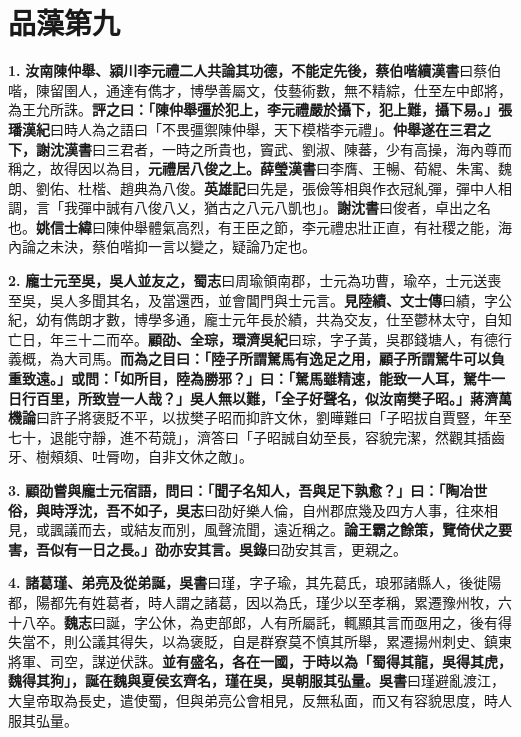 \chapter{品藻第九}

\textbf{1.} \textbf{汝南陳仲舉、潁川李元禮二人共論其功德，不能定先後，蔡伯喈}{\footnotesize \textbf{續漢書}曰蔡伯喈，陳留圉人，通達有儁才，博學善屬文，伎藝術數，無不精綜，仕至左中郎將，為王允所誅。}\textbf{評之曰：「陳仲舉彊於犯上，李元禮嚴於攝下，犯上難，攝下易。」}{\footnotesize \textbf{張璠漢紀}曰時人為之語曰「不畏彊禦陳仲舉，天下模楷李元禮」。}\textbf{仲舉遂在三君之下，}{\footnotesize \textbf{謝沈漢書}曰三君者，一時之所貴也，竇武、劉淑、陳蕃，少有高操，海內尊而稱之，故得因以為目，}\textbf{元禮居八俊之上。}{\footnotesize \textbf{薛瑩漢書}曰李膺、王暢、荀緄、朱㝢、魏朗、劉佑、杜楷、趙典為八俊。\textbf{英雄記}曰先是，張儉等相與作衣冠糺彈，彈中人相調，言「我彈中誠有八俊八乂，猶古之八元八凱也」。\textbf{謝沈書}曰俊者，卓出之名也。\textbf{姚信士緯}曰陳仲舉體氣高烈，有王臣之節，李元禮忠壯正直，有社稷之能，海內論之未決，蔡伯喈抑一言以變之，疑論乃定也。}

\textbf{2.} \textbf{龐士元至吳，吳人並友之，}{\footnotesize \textbf{蜀志}曰周瑜領南郡，士元為功曹，瑜卒，士元送喪至吳，吳人多聞其名，及當還西，並會閶門與士元言。}\textbf{見陸績、}{\footnotesize \textbf{文士傳}曰績，字公紀，幼有儁朗才數，博學多通，龐士元年長於績，共為交友，仕至鬱林太守，自知亡日，年三十二而卒。}\textbf{顧劭、全琮，}{\footnotesize \textbf{環濟吳紀}曰琮，字子黃，吳郡錢塘人，有德行義概，為大司馬。}\textbf{而為之目曰：「陸子所謂駑馬有逸足之用，顧子所謂駑牛可以負重致遠。」或問：「如所目，陸為勝邪？」曰：「駑馬雖精速，能致一人耳，駑牛一日行百里，所致豈一人哉？」吳人無以難，「全子好聲名，似汝南樊子昭。」}{\footnotesize \textbf{蔣濟萬機論}曰許子將褒貶不平，以拔樊子昭而抑許文休，劉曄難曰「子昭拔自賈豎，年至七十，退能守靜，進不苟競」，濟答曰「子昭誠自幼至長，容貌完潔，然觀其插齒牙、樹頰頦、吐脣吻，自非文休之敵」。}

\textbf{3.} \textbf{顧劭嘗與龐士元宿語，問曰：「聞子名知人，吾與足下孰愈？」曰：「陶冶世俗，與時浮沈，吾不如子，}{\footnotesize \textbf{吳志}曰劭好樂人倫，自州郡庶幾及四方人事，往來相見，或諷議而去，或結友而別，風聲流聞，遠近稱之。}\textbf{論王霸之餘策，覽倚伏之要害，吾似有一日之長。」劭亦安其言。}{\footnotesize \textbf{吳錄}曰劭安其言，更親之。}

\textbf{4.} \textbf{諸葛瑾、弟亮及從弟誕，}{\footnotesize \textbf{吳書}曰瑾，字子瑜，其先葛氏，琅邪諸縣人，後徙陽都，陽都先有姓葛者，時人謂之諸葛，因以為氏，瑾少以至孝稱，累遷豫州牧，六十八卒。\textbf{魏志}曰誕，字公休，為吏部郎，人有所屬託，輒顯其言而亟用之，後有得失當不，則公議其得失，以為褒貶，自是群寮莫不慎其所舉，累遷揚州刺史、鎮東將軍、司空，謀逆伏誅。}\textbf{並有盛名，各在一國，于時以為「蜀得其龍，吳得其虎，魏得其狗」，誕在魏與夏侯玄齊名，瑾在吳，吳朝服其弘量。}{\footnotesize \textbf{吳書}曰瑾避亂渡江，大皇帝取為長史，遣使蜀，但與弟亮公會相見，反無私面，而又有容貌思度，時人服其弘量。}

